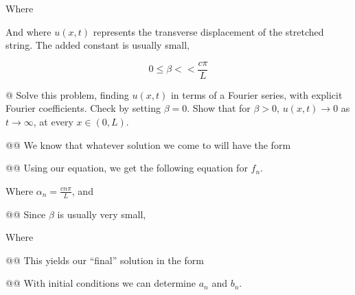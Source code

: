\documentclass[10pt]{article}
\begin{document}
Where


And where $u(x, t)$ represents the transverse displacement of the stretched string. The added constant is usually small,

\[
    0 \le \beta << \frac{c\pi}{L}
\]

\begin{easylist}[enumerate]
    @ Solve this problem, finding $u(x, t)$ in terms of a Fourier series, with explicit Fourier coefficients. Check by
    setting $\beta = 0$. Show that for $\beta > 0$, $u(x, t) \to 0$ as $t \to \infty$, at every $x \in (0, L)$.

    @@ We know that whatever solution we come to will have the form


    @@ Using our equation, we get the following equation for $f_n$.


    Where $\alpha_n = \frac{cn\pi}{L}$, and


    @@ Since $\beta$ is usually very small,


    Where


    @@ This yields our ``final'' solution in the form


    @@ With initial conditions we can determine $a_n$ and $b_n$.


\end{easylist}
\end{document}

